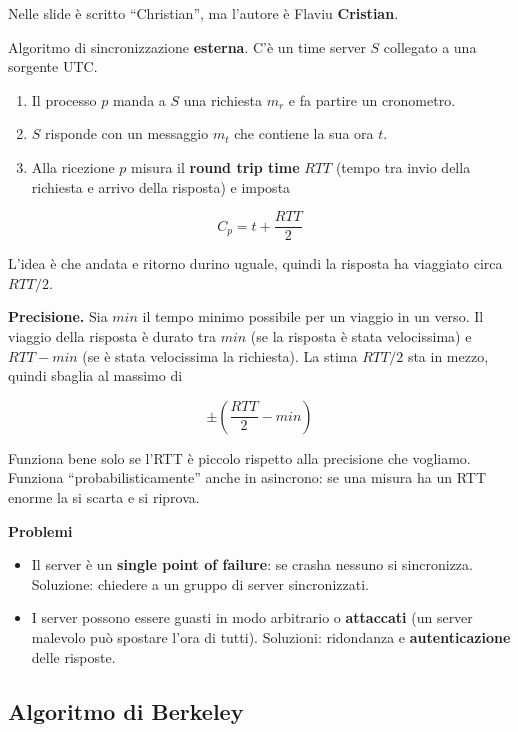 Nelle slide è scritto ``Christian'', ma l'autore è Flaviu \textbf{Cristian}.

Algoritmo di sincronizzazione \textbf{esterna}. C'è un time server \(S\) collegato a una sorgente UTC.

\begin{enumerate}
\def\labelenumi{\arabic{enumi}.}
\tightlist
\item
  Il processo \(p\) manda a \(S\) una richiesta \(m_r\) e fa partire un cronometro.
\item
  \(S\) risponde con un messaggio \(m_t\) che contiene la sua ora \(t\).
\item
  Alla ricezione \(p\) misura il \textbf{round trip time} \(RTT\) (tempo tra invio della richiesta e arrivo della risposta) e imposta
\end{enumerate}

\[
C_p = t + \frac{RTT}{2}
\]

L'idea è che andata e ritorno durino uguale, quindi la risposta ha viaggiato circa \(RTT/2\).

\textbf{Precisione.} Sia \(min\) il tempo minimo possibile per un viaggio in un verso. Il viaggio della risposta è durato tra \(min\) (se la risposta è stata velocissima) e \(RTT - min\) (se è stata velocissima la richiesta). La stima \(RTT/2\) sta in mezzo, quindi sbaglia al massimo di

\[
\pm \left( \frac{RTT}{2} - min \right)
\]

Funziona bene solo se l'RTT è piccolo rispetto alla precisione che vogliamo. Funziona ``probabilisticamente'' anche in asincrono: se una misura ha un RTT enorme la si scarta e si riprova.

\textbf{Problemi}

\begin{itemize}
\tightlist
\item
  Il server è un \textbf{single point of failure}: se crasha nessuno si sincronizza. Soluzione: chiedere a un gruppo di server sincronizzati.
\item
  I server possono essere guasti in modo arbitrario o \textbf{attaccati} (un server malevolo può spostare l'ora di tutti). Soluzioni: ridondanza e \textbf{autenticazione} delle risposte.
\end{itemize}

\subsection{Algoritmo di Berkeley}

